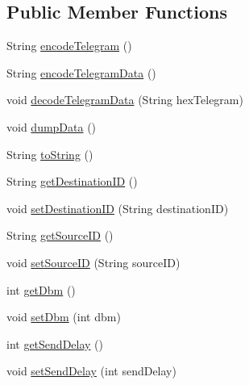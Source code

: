 \subsection*{Public Member Functions}
\begin{DoxyCompactItemize}
\item 
String \hyperlink{classch_1_1bfh_1_1gr33nopo55um_1_1enocean_1_1telegram_1_1_remote_man_command_aee8b38ab2203e839c8887386739a4f6b}{encode\+Telegram} ()
\item 
String \hyperlink{classch_1_1bfh_1_1gr33nopo55um_1_1enocean_1_1telegram_1_1_remote_man_command_adeb42a288935b022f0af305fb53a2d9a}{encode\+Telegram\+Data} ()
\item 
void \hyperlink{classch_1_1bfh_1_1gr33nopo55um_1_1enocean_1_1telegram_1_1_remote_man_command_a111c14179b713ad21ad3788f71b88740}{decode\+Telegram\+Data} (String hex\+Telegram)
\item 
void \hyperlink{classch_1_1bfh_1_1gr33nopo55um_1_1enocean_1_1telegram_1_1_remote_man_command_aa1b0cdd23d15c1712683defdb00a08e3}{dump\+Data} ()
\item 
String \hyperlink{classch_1_1bfh_1_1gr33nopo55um_1_1enocean_1_1telegram_1_1_remote_man_command_a2679db1bbc80a2f014121612e97e8fde}{to\+String} ()
\item 
String \hyperlink{classch_1_1bfh_1_1gr33nopo55um_1_1enocean_1_1telegram_1_1_remote_man_command_ad7a6d78d341a325b40a2754aadb6ff26}{get\+Destination\+ID} ()
\item 
void \hyperlink{classch_1_1bfh_1_1gr33nopo55um_1_1enocean_1_1telegram_1_1_remote_man_command_ae98150ec6ac51e8922baaca923a6353e}{set\+Destination\+ID} (String destination\+ID)
\item 
String \hyperlink{classch_1_1bfh_1_1gr33nopo55um_1_1enocean_1_1telegram_1_1_remote_man_command_af43e6a3480cfa9bf4720b7504621e33c}{get\+Source\+ID} ()
\item 
void \hyperlink{classch_1_1bfh_1_1gr33nopo55um_1_1enocean_1_1telegram_1_1_remote_man_command_a5c7238fc8509de7415fe9b38cfd43e17}{set\+Source\+ID} (String source\+ID)
\item 
int \hyperlink{classch_1_1bfh_1_1gr33nopo55um_1_1enocean_1_1telegram_1_1_remote_man_command_af87090957175a82debea309582f4eaf0}{get\+Dbm} ()
\item 
void \hyperlink{classch_1_1bfh_1_1gr33nopo55um_1_1enocean_1_1telegram_1_1_remote_man_command_afbc945f039505ebed7e6b0540b85dbad}{set\+Dbm} (int dbm)
\item 
int \hyperlink{classch_1_1bfh_1_1gr33nopo55um_1_1enocean_1_1telegram_1_1_remote_man_command_a836bf08225e3992cec6a2a77f3571493}{get\+Send\+Delay} ()
\item 
void \hyperlink{classch_1_1bfh_1_1gr33nopo55um_1_1enocean_1_1telegram_1_1_remote_man_command_a9c8d0617c4eb4c4c9c2433d7cec43b64}{set\+Send\+Delay} (int send\+Delay)
\end{DoxyCompactItemize}


